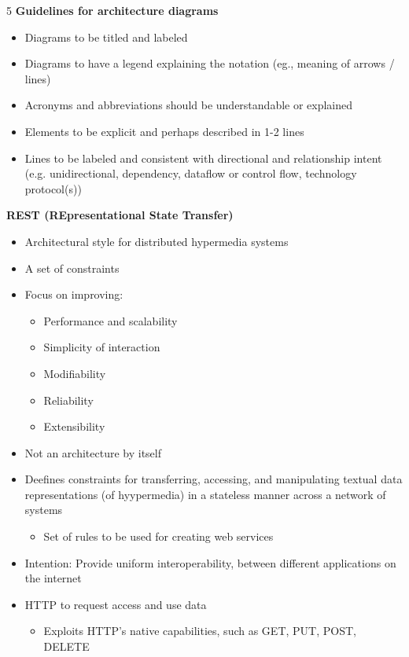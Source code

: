 \documentclass[landscape,a4paper]{extarticle}
\begin{document}
\begin{multicols*}{5}
    \textbf{Guidelines for architecture diagrams}

    \begin{itemize}
        \item Diagrams to be titled and labeled
        \item Diagrams to have a legend explaining the notation (eg., meaning of arrows / lines)
        \item Acronyms and abbreviations should be understandable or explained
        \item Elements to be explicit and perhaps described in 1-2 lines
        \item Lines to be labeled and consistent with directional and relationship intent (e.g. unidirectional, dependency, dataflow or control flow, technology protocol(s))
    \end{itemize}

    \textbf{REST (REpresentational State Transfer)}

    \begin{itemize}
        \item Architectural style for distributed hypermedia systems
        \item A set of constraints
        \item Focus on improving:
        \begin{itemize}
            \item Performance and scalability
            \item Simplicity of interaction
            \item Modifiability
            \item Reliability
            \item Extensibility
        \end{itemize}
        \item Not an architecture by itself
        \item Deefines constraints for transferring, accessing, and manipulating textual data representations (of hyypermedia) in a stateless manner across a network of systems
        \begin{itemize}
            \item Set of rules to be used for creating web services
        \end{itemize}
        \item Intention: Provide uniform interoperability, between different applications on the internet
        \item HTTP to request access and use data
        \begin{itemize}
            \item Exploits HTTP's native capabilities, such as GET, PUT, POST, DELETE
        \end{itemize}
    \end{itemize}


\end{multicols*}
\end{document}
